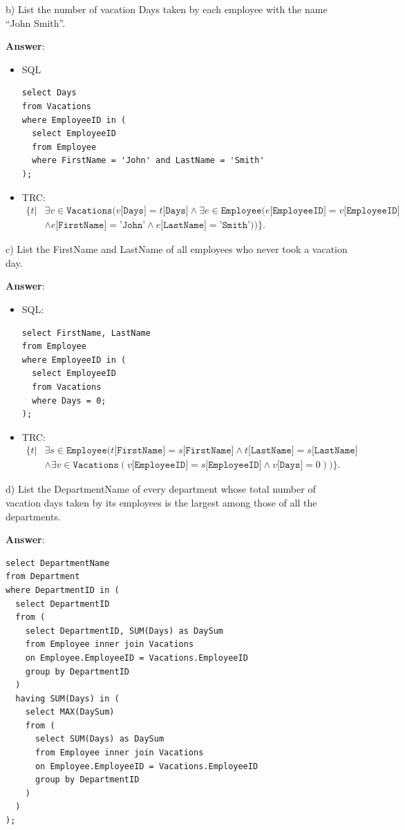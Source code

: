 \documentclass{article}
\begin{document}
b) List the number of vacation Days taken by each employee with the name ``John Smith''.

{\bf Answer}:
\begin{itemize}
\item SQL
\begin{verbatim}
select Days
from Vacations
where EmployeeID in (
  select EmployeeID
  from Employee
  where FirstName = 'John' and LastName = 'Smith'
);
\end{verbatim}

\item TRC:
$$\begin{aligned}
\{t | & \exists v \in \texttt{Vacations} (v\texttt{[Days]} = t\texttt{[Days]}
 \wedge \exists e \in \texttt{Employee} (e\texttt{[EmployeeID]} = v\texttt{[EmployeeID]} \\
&\wedge e\texttt{[FirstName]} = \texttt{'John'} \wedge e\texttt{[LastName]} = \texttt{'Smith'}))\}.
\end{aligned}$$
\end{itemize}


c) List the FirstName and LastName of all employees who never took a vacation day.

{\bf Answer}:
\begin{itemize}
\item SQL:
\begin{verbatim}
select FirstName, LastName
from Employee
where EmployeeID in (
  select EmployeeID
  from Vacations
  where Days = 0;
);
\end{verbatim}

\item TRC:
$$\begin{aligned}
\{t | & \exists s \in \texttt{Employee} (t\texttt{[FirstName]} = s\texttt{[FirstName]} \wedge t\texttt{[LastName]} = s\texttt{[LastName]}\\
& \wedge \exists v \in \texttt{Vacations} (v\texttt{[EmployeeID]} = s\texttt{[EmployeeID]} 
\wedge v\texttt{[Days]} = 0))\}.
\end{aligned}$$
\end{itemize}

d) List the DepartmentName of every department whose total number of vacation days taken by its employees is the largest among those of all the departments.

{\bf Answer}:
\begin{verbatim}
select DepartmentName
from Department
where DepartmentID in (
  select DepartmentID
  from (
    select DepartmentID, SUM(Days) as DaySum
    from Employee inner join Vacations
    on Employee.EmployeeID = Vacations.EmployeeID
    group by DepartmentID
  )
  having SUM(Days) in (
    select MAX(DaySum)
    from (
      select SUM(Days) as DaySum
      from Employee inner join Vacations
      on Employee.EmployeeID = Vacations.EmployeeID
      group by DepartmentID
    )
  )
);
\end{verbatim}
\end{document}
